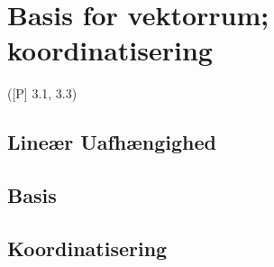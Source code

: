 \newpage
\chapter{Basis for vektorrum; koordinatisering}
([P] 3.1, 3.3)
\section{Lineær Uafhængighed}



\section{Basis}





\section{Koordinatisering}


